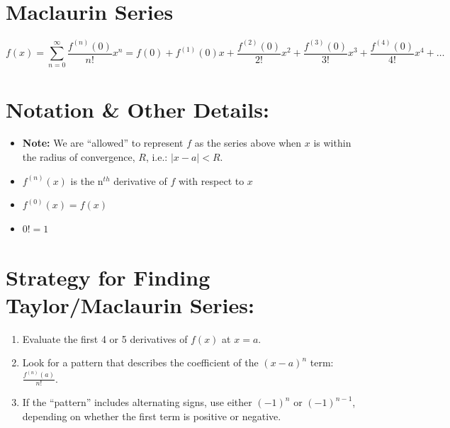 %
%
\section*{Maclaurin Series}%
\vspace*{-.1in}
\[
f(x) = \sum_{n=0}^\infty \frac{f^{(n)}(0)}{n!}x^n = f(0) + f^{(1)}(0)x 
+ \frac{f^{(2)}(0)}{2!}x^2 + \frac{f^{(3)}(0)}{3!}x^3+\frac{f^{(4)}(0)}{4!}x^4+\ldots
\]
 
\vspace*{.1in}

\section*{ Notation \& Other Details:}
\begin{itemize}
\item \textbf{Note:} We are ``allowed'' to represent \(f\) as the series above when \(x\) is within the radius of convergence, \(R\), i.e.: \(|x-a|<R\).
\item \(f^{(n)}(x)\) is the n\(^{th}\) derivative of \(f\) with respect to \(x\)
\item \(f^{(0)}(x) = f(x)\)
\item \(0! = 1\)
\end{itemize}
%  
  
  

\section*{Strategy for Finding Taylor/Maclaurin Series:}
\begin{enumerate}[(1)]
\item Evaluate the first 4 or 5 derivatives of \(f(x)\) at \(x=a\).
\item Look for a pattern that describes the coefficient of the \((x-a)^n\) term:
\(\frac{f^{(n)}(a)}{n!}\).
\item If the ``pattern'' includes alternating signs, use either \((-1)^n\) or \((-1)^{n-1}\), depending on whether the first term is positive or negative.
\end{enumerate}


